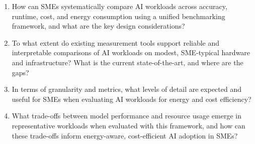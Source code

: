 \begin{enumerate}
    \item How can SMEs systematically compare AI workloads across 
    accuracy, runtime, cost, and energy consumption using a unified 
    benchmarking framework, and what are the key design considerations?
    \item To what extent do existing measurement tools support reliable
    and interpretable comparisons of AI workloads on modest, SME-typical
    hardware and infrastructure? What is the current state-of-the-art, and where are the gaps?
    \item In terms of granularity and metrics, what levels of detail are expected
    and useful for SMEs when evaluating AI workloads for energy and cost efficiency?
    \item What trade-offs between model performance and resource usage 
    emerge in representative workloads when evaluated with this framework,
    and how can these trade-offs inform energy-aware, cost-efficient AI 
    adoption in SMEs?
\end{enumerate}
